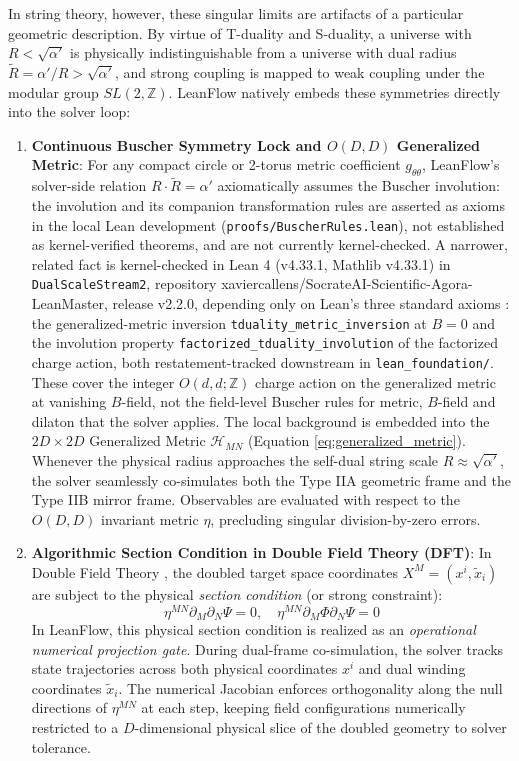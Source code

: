 \documentclass[11pt,a4paper]{article}
\begin{document}
In string theory, however, these singular limits are artifacts of a particular geometric description. By virtue of T-duality and S-duality, a universe with $R < \sqrt{\alpha'}$ is physically indistinguishable from a universe with dual radius $\widetilde{R} = \alpha'/R > \sqrt{\alpha'}$, and strong coupling is mapped to weak coupling under the modular group $SL(2, \mathbb{Z})$. LeanFlow natively embeds these symmetries directly into the solver loop:
\begin{enumerate}
    \item \textbf{Continuous Buscher Symmetry Lock and $O(D,D)$ Generalized Metric}: For any compact circle or 2-torus metric coefficient $g_{\theta\theta}$, LeanFlow's solver-side relation $R \cdot \widetilde{R} = \alpha'$ axiomatically assumes the Buscher involution: the involution and its companion transformation rules are asserted as axioms in the local Lean development (\texttt{proofs/BuscherRules.lean}), not established as kernel-verified theorems, and are not currently kernel-checked. A narrower, related fact is kernel-checked in Lean 4 (v4.33.1, Mathlib v4.33.1) in \texttt{DualScaleStream2}, repository xaviercallens/SocrateAI-Scientific-Agora-LeanMaster, release v2.2.0, depending only on Lean's three standard axioms \cite{leanmaster2026}: the generalized-metric inversion \texttt{tduality\_metric\_inversion} at $B=0$ and the involution property \texttt{factorized\_tduality\_involution} of the factorized charge action, both restatement-tracked downstream in \texttt{lean\_foundation/}. These cover the integer $O(d,d;\mathbb{Z})$ charge action on the generalized metric at vanishing $B$-field, not the field-level Buscher rules for metric, $B$-field and dilaton that the solver applies. The local background is embedded into the $2D \times 2D$ Generalized Metric $\mathcal{H}_{MN}$ (Equation \ref{eq:generalized_metric}). Whenever the physical radius approaches the self-dual string scale $R \approx \sqrt{\alpha'}$, the solver seamlessly co-simulates both the Type IIA geometric frame and the Type IIB mirror frame. Observables are evaluated with respect to the $O(D, D)$ invariant metric $\eta$, precluding singular division-by-zero errors.

    \item \textbf{Algorithmic Section Condition in Double Field Theory (DFT)}: In Double Field Theory \cite{hull2009, hohm2010}, the doubled target space coordinates $X^M = (x^i, \tilde{x}_i)$ are subject to the physical \emph{section condition} (or strong constraint):
    \begin{equation}
    \eta^{MN} \partial_M \partial_N \Psi = 0, \quad \eta^{MN} \partial_M \Phi \partial_N \Psi = 0
    \end{equation}
    In LeanFlow, this physical section condition is realized as an \emph{operational numerical projection gate}. During dual-frame co-simulation, the solver tracks state trajectories across both physical coordinates $x^i$ and dual winding coordinates $\tilde{x}_i$. The numerical Jacobian enforces orthogonality along the null directions of $\eta^{MN}$ at each step, keeping field configurations numerically restricted to a $D$-dimensional physical slice of the doubled geometry to solver tolerance.


\end{enumerate}
\end{document}
